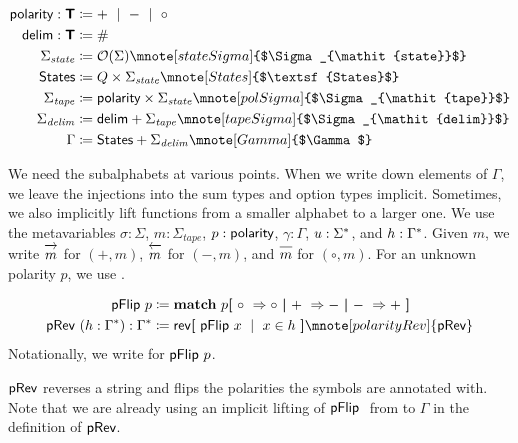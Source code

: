 \newcommand{\stateSigma}{\Sigma_{\mathit{state}}}
\newcommand{\delimSigma}{\Sigma_{\mathit{delim}}}
\newcommand{\tapeSigma}{\Sigma_{\mathit{tape}}}
\newcommand{\States}{\textsf{States}}
\begin{align*}
  \polarity : \Type &\defeq + \bnfmid - \bnfmid \circ \\
  \textsf{delim} : \Type &\defeq \# \\
  \stateSigma &\defeq \opt{\Sigma} \mnote[stateSigma]{$\stateSigma$}\\
  \States &\defeq Q \times \stateSigma \mnote[States]{$\States$}\\
  \tapeSigma &\defeq \polarity \times \stateSigma \mnote[polSigma]{$\tapeSigma$}\\
  \delimSigma &\defeq \textsf{delim} + \tapeSigma \mnote[tapeSigma]{$\delimSigma$}\\
  \Gamma &\defeq \States + \delimSigma
  \mnote[Gamma]{$\Gamma$}
\end{align*}

We need the subalphabets at various points. When we write down elements of $\Gamma$, we leave the injections into the sum types and option types implicit. Sometimes, we also implicitly lift functions from a smaller alphabet to a larger one.
We use the metavariables $\sigma : \Sigma$, $m : \tapeSigma$, $p : \textsf{polarity}$, $\gamma : \Gamma$, $u : \Sigma^*$, and $h : \Gamma^*$. 
Given $m$, we write $\polpos{m}$ for $(+, m)$, $\polneg{m}$ for $(-, m)$, and $\polneut{m}$ for $(\circ, m)$. For an unknown polarity $p$, we use .

\begin{definition}
  \begin{align*}
    \pFlip{p} &\defeq \match p \withl \circ~\Rightarrow \circ \withm +~\Rightarrow - \withm -~\Rightarrow +\withr \\
    \pRev~(h : \str{\Gamma}) : \str{\Gamma} &\defeq \rev{\withl\pFlip{x} \bnfmid x \in h\withr}
    \mnote[polarityRev]{\pRev}
  \end{align*}
  Notationally, we write  for $\textsf{pFlip}~p$. 
\end{definition}
$\textsf{pRev}$ reverses a string and flips the polarities the symbols are annotated with.
Note that we are already using an implicit lifting of $\textsf{pFlip}~$ from \polarity{} to $\Gamma$ in the definition of $\textsf{pRev}$. 

